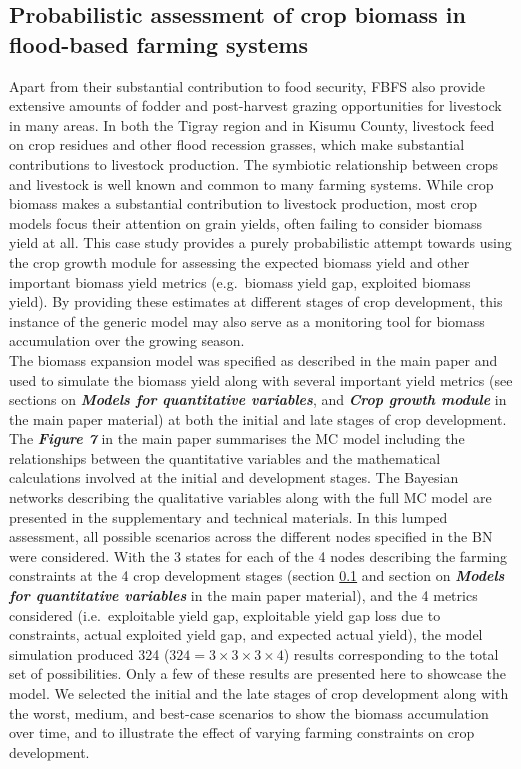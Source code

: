 \documentclass[]{elsarticle} %
\begin{document}
\hypertarget{refs52}{%
\subsection{Probabilistic assessment of crop biomass in flood-based farming systems}\label{refs52}}

Apart from their substantial contribution to food security, FBFS also provide extensive amounts of fodder and post-harvest grazing opportunities for livestock in many areas. In both the Tigray region and in Kisumu County, livestock feed on crop residues and other flood recession grasses, which make substantial contributions to livestock production. The symbiotic relationship between crops and livestock is well known and common to many farming systems. While crop biomass makes a substantial contribution to livestock production, most crop models focus their attention on grain yields, often failing to consider biomass yield at all. This case study provides a purely probabilistic attempt towards using the crop growth module for assessing the expected biomass yield and other important biomass yield metrics (e.g.~biomass yield gap, exploited biomass yield). By providing these estimates at different stages of crop development, this instance of the generic model may also serve as a monitoring tool for biomass accumulation over the growing season.\\
The biomass expansion model was specified as described in the main paper and used to simulate the biomass yield along with several important yield metrics (see sections on \textbf{\emph{Models for quantitative variables}}, and \textbf{\emph{Crop growth module}} in the main paper material) at both the initial and late stages of crop development. The \textbf{\emph{Figure 7}} in the main paper summarises the MC model including the relationships between the quantitative variables and the mathematical calculations involved at the initial and development stages. The Bayesian networks describing the qualitative variables along with the full MC model are presented in the supplementary and technical materials. In this lumped assessment, all possible scenarios across the different nodes specified in the BN were considered. With the 3 states for each of the 4 nodes describing the farming constraints at the 4 crop development stages (section \ref{refs52} and section on \textbf{\emph{Models for quantitative variables}} in the main paper material), and the 4 metrics considered (i.e.~exploitable yield gap, exploitable yield gap loss due to constraints, actual exploited yield gap, and expected actual yield), the model simulation produced 324 (\(324 = 3\times3\times3\times4\)) results corresponding to the total set of possibilities. Only a few of these results are presented here to showcase the model. We selected the initial and the late stages of crop development along with the worst, medium, and best-case scenarios to show the biomass accumulation over time, and to illustrate the effect of varying farming constraints on crop development.
\end{document}
